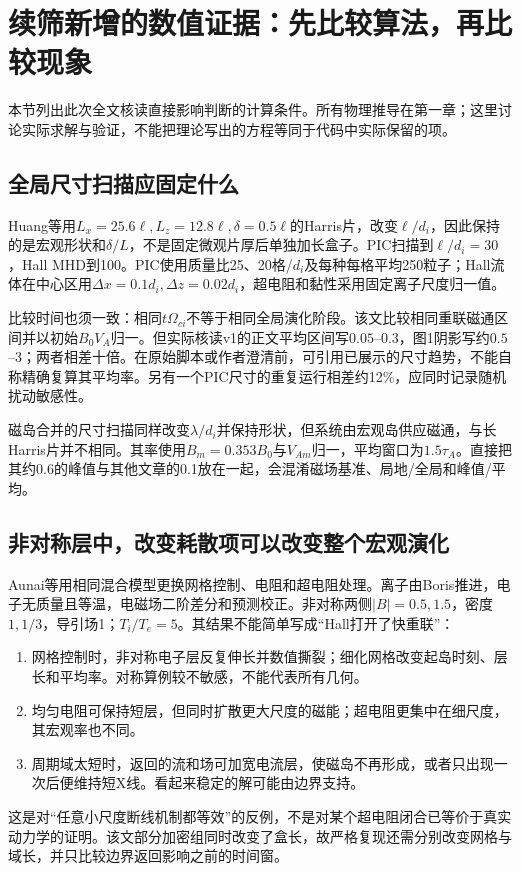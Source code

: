\section{续筛新增的数值证据：先比较算法，再比较现象}
\label{sec:remaining-numerics}
本节列出此次全文核读直接影响判断的计算条件。所有物理推导在第一章；这里讨论实际求解与验证，不能把理论写出的方程等同于代码中实际保留的项。

\subsection{全局尺寸扫描应固定什么}
Huang等\citep{F600}用$L_x=25.6\ell,L_z=12.8\ell,\delta=0.5\ell$的Harris片，改变$\ell/d_i$，因此保持的是宏观形状和$\delta/L$，不是固定微观片厚后单独加长盒子。PIC扫描到$\ell/d_i=30$，Hall MHD到100。PIC使用质量比25、20格/$d_i$及每种每格平均250粒子；Hall流体在中心区用$\Delta x=0.1d_i,\Delta z=0.02d_i$，超电阻和黏性采用固定离子尺度归一值。

比较时间也须一致：相同$t\Omega_{ci}$不等于相同全局演化阶段。该文比较相同重联磁通区间并以初始$B_0V_A$归一。但实际核读v1的正文平均区间写$0.05$--$0.3$，图1阴影写约$0.5$--$3$；两者相差十倍。在原始脚本或作者澄清前，可引用已展示的尺寸趋势，不能自称精确复算其平均率。另有一个PIC尺寸的重复运行相差约12\%，应同时记录随机扰动敏感性。

磁岛合并的尺寸扫描\citep{L241}同样改变$\lambda/d_i$并保持形状，但系统由宏观岛供应磁通，与长Harris片并不相同。其率使用$B_m=0.353B_0$与$V_{Am}$归一，平均窗口为$1.5\tau_A$。直接把其约0.6的峰值与其他文章的0.1放在一起，会混淆磁场基准、局地/全局和峰值/平均。

\subsection{非对称层中，改变耗散项可以改变整个宏观演化}
Aunai等\citep{F625}用相同混合模型更换网格控制、电阻和超电阻处理。离子由Boris推进，电子无质量且等温，电磁场二阶差分和预测校正。非对称两侧$|B|=0.5,1.5$，密度$1,1/3$，导引场1；$T_i/T_e=5$。其结果不能简单写成“Hall打开了快重联”：
\begin{enumerate}
 \item 网格控制时，非对称电子层反复伸长并数值撕裂；细化网格改变起岛时刻、层长和平均率。对称算例较不敏感，不能代表所有几何。
 \item 均匀电阻可保持短层，但同时扩散更大尺度的磁能；超电阻更集中在细尺度，其宏观率也不同。
 \item 周期域太短时，返回的流和场可加宽电流层，使磁岛不再形成，或者只出现一次后便维持短X线。看起来稳定的解可能由边界支持。
\end{enumerate}
这是对“任意小尺度断线机制都等效”的反例，不是对某个超电阻闭合已等价于真实动力学的证明。该文部分加密组同时改变了盒长，故严格复现还需分别改变网格与域长，并只比较边界返回影响之前的时间窗。

